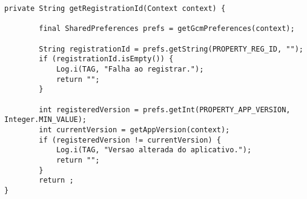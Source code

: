\begin{lstlisting}[style=custom_JAVA]
private String getRegistrationId(Context context) {

        final SharedPreferences prefs = getGcmPreferences(context);

        String registrationId = prefs.getString(PROPERTY_REG_ID, "");
        if (registrationId.isEmpty()) {
            Log.i(TAG, "Falha ao registrar.");
            return "";
        }
  
        int registeredVersion = prefs.getInt(PROPERTY_APP_VERSION, Integer.MIN_VALUE);
        int currentVersion = getAppVersion(context);
        if (registeredVersion != currentVersion) {
            Log.i(TAG, "Versao alterada do aplicativo.");
            return "";
        }
        return ;
}
\end{lstlisting}